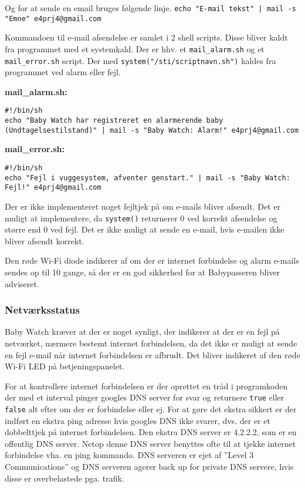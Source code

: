 Og for at sende en email bruges følgende linje. \newline
\verb+echo "E-mail tekst" | mail -s "Emne" e4prj4@gmail.com+

Kommandoen til e-mail afsendelse er samlet i 2 shell scripts. Disse bliver kaldt fra programmet med et systemkald. Der er hhv. et \verb+mail_alarm.sh+ og et \verb+mail_error.sh+ script. Der med \verb+system("/sti/scriptnavn.sh")+ kaldes fra programmet ved alarm eller fejl.

\textbf{mail\_alarm.sh:}
\begin{lstlisting}
#!/bin/sh
echo "Baby Watch har registreret en alarmerende baby (Undtagelsestilstand)" | mail -s "Baby Watch: Alarm!" e4prj4@gmail.com
\end{lstlisting}

\textbf{mail\_error.sh:}
\begin{lstlisting}
#!/bin/sh
echo "Fejl i vuggesystem, afventer genstart." | mail -s "Baby Watch: Fejl!" e4prj4@gmail.com
\end{lstlisting}

Der er ikke implementeret noget fejltjek på om e-mails bliver afsendt. Det er muligt at implementere, da \verb+system()+ returnerer 0 ved korrekt afsendelse og større end 0 ved fejl. Det er ikke muligt at sende en e-mail, hvis e-mailen ikke bliver afsendt korrekt. 

Den røde Wi-Fi diode indikerer af om der er internet forbindelse og alarm e-mails sendes op til 10 gange, så der er en god sikkerhed for at Babypasseren bliver adviseret.

\subsubsection*{Netværksstatus}

Baby Watch kræver at der er noget synligt, der indikerer at der er en fejl på netværket, nærmere bestemt internet forbindelsen, da det ikke er muligt at sende en fejl e-mail når internet forbindelsen er afbrudt. Det bliver indikeret af den røde Wi-Fi LED på betjeningspanelet.

For at kontrollere internet forbindelsen er der oprettet en tråd i programkoden der med et interval pinger googles DNS server for svar og returnere \verb+true+ eller \verb+false+ alt efter om der er forbindelse eller ej. For at gøre det ekstra sikkert er der indført en ekstra ping adresse hvis googles DNS ikke svarer, dvs. der er et dobbelttjek på internet forbindelsen. Den ekstra DNS server er 4.2.2.2, som er en offentlig DNS server. Netop denne DNS server benyttes ofte til at tjekke internet forbindelse vha. en ping kommando. DNS serveren er ejet af ''Level 3 Communications'' og DNS serveren agerer back up for private DNS servere, hvis disse er overbelastede pga. trafik.  

